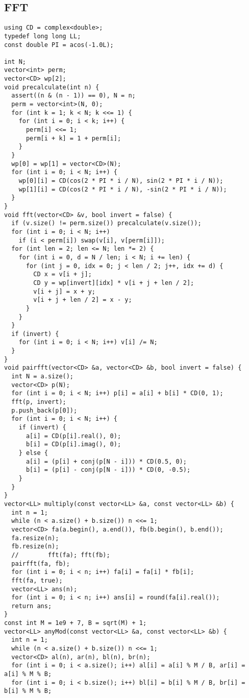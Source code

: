 \documentclass[FSZ,a4paper,onesided]{article}
\begin{document}
\begin{multicols*}{\COLS}
\begin{lstlisting}
\end{lstlisting}
\subsection{FFT}
\begin{lstlisting}
using CD = complex<double>;
typedef long long LL;
const double PI = acos(-1.0L);

int N;
vector<int> perm;
vector<CD> wp[2];
void precalculate(int n) {
  assert((n & (n - 1)) == 0), N = n;
  perm = vector<int>(N, 0);
  for (int k = 1; k < N; k <<= 1) {
    for (int i = 0; i < k; i++) {
      perm[i] <<= 1;
      perm[i + k] = 1 + perm[i];
    }
  }
  wp[0] = wp[1] = vector<CD>(N);
  for (int i = 0; i < N; i++) {
    wp[0][i] = CD(cos(2 * PI * i / N), sin(2 * PI * i / N));
    wp[1][i] = CD(cos(2 * PI * i / N), -sin(2 * PI * i / N));
  }
}
void fft(vector<CD> &v, bool invert = false) {
  if (v.size() != perm.size()) precalculate(v.size());
  for (int i = 0; i < N; i++)
    if (i < perm[i]) swap(v[i], v[perm[i]]);
  for (int len = 2; len <= N; len *= 2) {
    for (int i = 0, d = N / len; i < N; i += len) {
      for (int j = 0, idx = 0; j < len / 2; j++, idx += d) {
        CD x = v[i + j];
        CD y = wp[invert][idx] * v[i + j + len / 2];
        v[i + j] = x + y;
        v[i + j + len / 2] = x - y;
      }
    }
  }
  if (invert) {
    for (int i = 0; i < N; i++) v[i] /= N;
  }
}
void pairfft(vector<CD> &a, vector<CD> &b, bool invert = false) {
  int N = a.size();
  vector<CD> p(N);
  for (int i = 0; i < N; i++) p[i] = a[i] + b[i] * CD(0, 1);
  fft(p, invert);
  p.push_back(p[0]);
  for (int i = 0; i < N; i++) {
    if (invert) {
      a[i] = CD(p[i].real(), 0);
      b[i] = CD(p[i].imag(), 0);
    } else {
      a[i] = (p[i] + conj(p[N - i])) * CD(0.5, 0);
      b[i] = (p[i] - conj(p[N - i])) * CD(0, -0.5);
    }
  }
}
vector<LL> multiply(const vector<LL> &a, const vector<LL> &b) {
  int n = 1;
  while (n < a.size() + b.size()) n <<= 1;
  vector<CD> fa(a.begin(), a.end()), fb(b.begin(), b.end());
  fa.resize(n);
  fb.resize(n);
  //        fft(fa); fft(fb);
  pairfft(fa, fb);
  for (int i = 0; i < n; i++) fa[i] = fa[i] * fb[i];
  fft(fa, true);
  vector<LL> ans(n);
  for (int i = 0; i < n; i++) ans[i] = round(fa[i].real());
  return ans;
}
const int M = 1e9 + 7, B = sqrt(M) + 1;
vector<LL> anyMod(const vector<LL> &a, const vector<LL> &b) {
  int n = 1;
  while (n < a.size() + b.size()) n <<= 1;
  vector<CD> al(n), ar(n), bl(n), br(n);
  for (int i = 0; i < a.size(); i++) al[i] = a[i] % M / B, ar[i] = a[i] % M % B;
  for (int i = 0; i < b.size(); i++) bl[i] = b[i] % M / B, br[i] = b[i] % M % B;

\end{lstlisting}
\end{multicols*}
\end{document}

